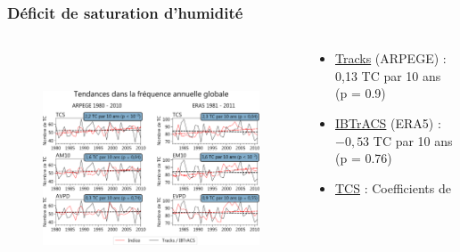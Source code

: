 \documentclass[aspectratio=169, usepdftitle=false, xcolor={dvipsnames}, 9pt,table]{beamer}
\begin{document}
\begin{frame}[t]
    \frametitle{Déficit de saturation d'humidité}
    \begin{columns}
        \begin{column}{0.7\textwidth}
            \vspace{-1.5em}
            \begin{figure}
                \centering
                \includegraphics[height=7cm]{Figures/trends.png}
            \end{figure}
        \end{column}
        \begin{column}{0.3\textwidth}
            \scriptsize
            \vspace{-1em}
            \begin{block}[Références]
                \setlength{\leftmargini}{2.5ex}
                \begin{itemize}
                   \item \underline{Tracks} (ARPEGE) :\\
                       0,13 TC par 10 ans (p = 0.9) 
                   \item \underline{IBTrACS} (ERA5) :\\
                        $-0,53$ TC par 10 ans (p = 0.76)
                \end{itemize}
            \end{block}
            \vspace{1em}
            \begin{examples}[Indices]
                \setlength{\leftmargini}{2.5ex}
                \begin{itemize}
                    \item \underline{TCS} : Coefficients de \cite{tippett_poisson_2011}

\end{itemize}
\end{examples}
\end{column}
\end{columns}
\end{frame}
\end{document}
